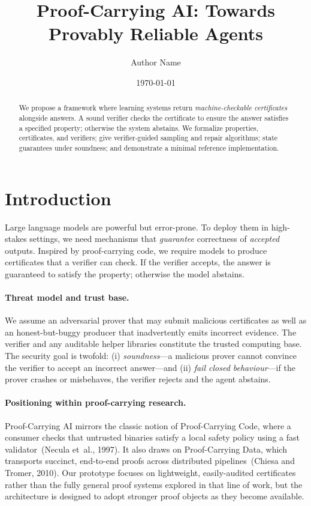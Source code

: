 \documentclass[11pt]{article}
\title{Proof-Carrying AI: Towards Provably Reliable Agents}
\author{Author Name}
\date{\today}
\begin{document}
\maketitle

\begin{abstract}
We propose a framework where learning systems return \emph{machine-checkable certificates} alongside answers. A sound verifier checks the certificate to ensure the answer satisfies a specified property; otherwise the system abstains. We formalize properties, certificates, and verifiers; give verifier-guided sampling and repair algorithms; state guarantees under soundness; and demonstrate a minimal reference implementation.
\end{abstract}

\section{Introduction}
Large language models are powerful but error-prone. To deploy them in high-stakes settings, we need mechanisms that \emph{guarantee} correctness of \emph{accepted} outputs. Inspired by proof-carrying code, we require models to produce certificates that a verifier can check. If the verifier accepts, the answer is guaranteed to satisfy the property; otherwise the model abstains.

\paragraph{Threat model and trust base.}
We assume an adversarial prover that may submit malicious certificates as well as an honest-but-buggy producer that inadvertently emits incorrect evidence. The verifier and any auditable helper libraries constitute the trusted computing base. The security goal is twofold: (i) \emph{soundness}---a malicious prover cannot convince the verifier to accept an incorrect answer---and (ii) \emph{fail closed behaviour}---if the prover crashes or misbehaves, the verifier rejects and the agent abstains.

\paragraph{Positioning within proof-carrying research.}
Proof-Carrying AI mirrors the classic notion of Proof-Carrying Code, where a consumer checks that untrusted binaries satisfy a local safety policy using a fast validator~(Necula et~al., 1997). It also draws on Proof-Carrying Data, which transports succinct, end-to-end proofs across distributed pipelines~(Chiesa and Tromer, 2010). Our prototype focuses on lightweight, easily-audited certificates rather than the fully general proof systems explored in that line of work, but the architecture is designed to adopt stronger proof objects as they become available.
\end{document}
